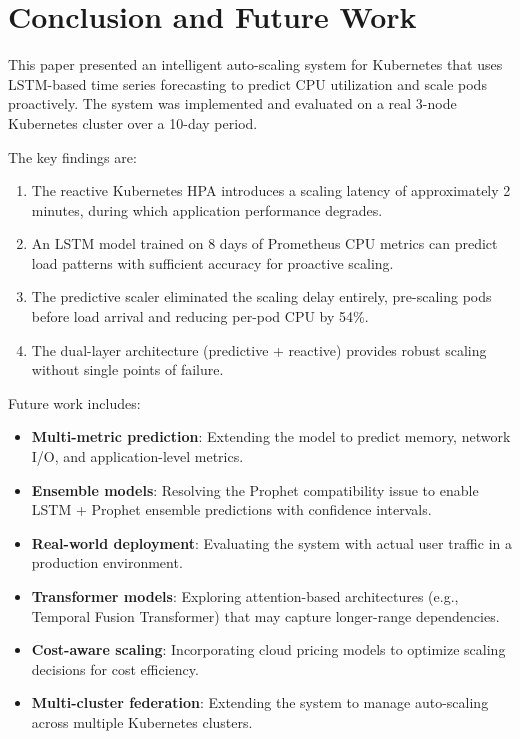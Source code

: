 \documentclass[journal]{IEEEtran}
\begin{document}
\section{Conclusion and Future Work}
\label{sec:conclusion}

This paper presented an intelligent auto-scaling system for Kubernetes that uses LSTM-based time series forecasting to predict CPU utilization and scale pods proactively. The system was implemented and evaluated on a real 3-node Kubernetes cluster over a 10-day period.

The key findings are:
\begin{enumerate}
    \item The reactive Kubernetes HPA introduces a scaling latency of approximately 2 minutes, during which application performance degrades.
    \item An LSTM model trained on 8 days of Prometheus CPU metrics can predict load patterns with sufficient accuracy for proactive scaling.
    \item The predictive scaler eliminated the scaling delay entirely, pre-scaling pods before load arrival and reducing per-pod CPU by 54\%.
    \item The dual-layer architecture (predictive + reactive) provides robust scaling without single points of failure.
\end{enumerate}

Future work includes:
\begin{itemize}
    \item \textbf{Multi-metric prediction}: Extending the model to predict memory, network I/O, and application-level metrics.
    \item \textbf{Ensemble models}: Resolving the Prophet compatibility issue to enable LSTM + Prophet ensemble predictions with confidence intervals.
    \item \textbf{Real-world deployment}: Evaluating the system with actual user traffic in a production environment.
    \item \textbf{Transformer models}: Exploring attention-based architectures (e.g., Temporal Fusion Transformer) that may capture longer-range dependencies.
    \item \textbf{Cost-aware scaling}: Incorporating cloud pricing models to optimize scaling decisions for cost efficiency.
    \item \textbf{Multi-cluster federation}: Extending the system to manage auto-scaling across multiple Kubernetes clusters.
\end{itemize}
\end{document}
